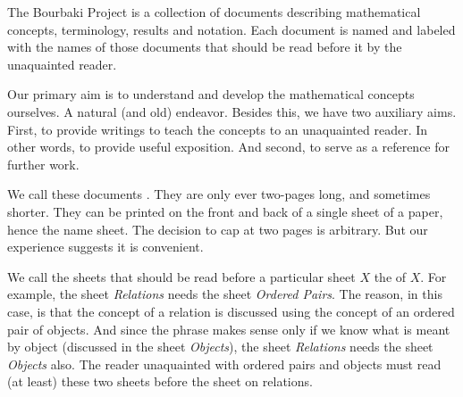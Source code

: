 
The Bourbaki Project is a collection
of documents describing mathematical
concepts, terminology, results and
notation. Each document is named and
labeled with the names of those documents
that should be read before it by the
unaquainted reader.

Our primary aim is to understand and
develop the mathematical concepts ourselves.
A natural (and old) endeavor.
Besides this, we have two auxiliary aims.
First, to provide writings to teach
the concepts to an unaquainted reader. In other
words, to provide useful exposition.
And second, to serve as a reference for
further work.

We call these documents .
They are only ever two-pages long, and
sometimes shorter.
They can be printed on the front
and back of a single
sheet of a paper, hence the name sheet.
The decision to cap at two pages is
arbitrary.
But our
experience suggests it is convenient.

We call the sheets that should
be read before a particular sheet
$X$ the  of $X$.
For example, the sheet \textit{Relations}
needs the sheet \textit{Ordered Pairs}.
The reason, in this case, is that the
concept of a relation is discussed using
the concept of an ordered pair of objects.
And since the phrase
 makes sense
only if we know what is meant by object
(discussed in the sheet \textit{Objects}),
the sheet \textit{Relations} needs the sheet
\textit{Objects} also.
The reader unaquainted with
ordered pairs and
objects must read (at least) these two
sheets before the sheet on relations.



%
%

